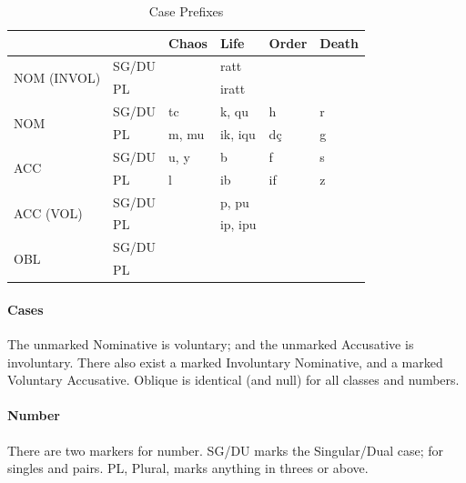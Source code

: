 \documentclass[11pt]{article}
\begin{document}
\begin{table}[H]
\begin{center}
\caption{Case Prefixes}
\label{table-cases}
\begin{tabular}{llllll}
                            &           & \textbf{Chaos} & \textbf{Life} & \textbf{Order} & \textbf{Death} \\
\hline\hline
\multirow{2}{*}{NOM (INVOL)} & SG/DU     &              & ratt         &               &               \\
                            & PL        &           & iratt       &              &               \\
\hline
\multirow{2}{*}{NOM}        & SG/DU     & tc             & k, qu         & h              & r              \\
                                                                                    & PL        & m, mu          & ik, iqu       & dç             & g              \\
\hline
\multirow{2}{*}{ACC}                 & SG/DU     & u, y           & b             & f              & s              \\
                            & PL        & l              & ib            & if             & z              \\
\hline
\multirow{2}{*}{ACC (VOL)}  & SG/DU     &                & p, pu         &                &                \\
                            & PL        &                & ip, ipu       &                &                \\
\hline
\multirow{2}{*}{OBL}        & SG/DU     &            &             &           &             \\
                            & PL        &            &             &         &           
\end{tabular}
\end{center}
\end{table}

\paragraph{Cases}
The unmarked Nominative is voluntary;
and the unmarked Accusative is involuntary.
There also exist a marked Involuntary Nominative,
and a marked Voluntary Accusative.
Oblique is identical (and null) for all classes and numbers.

\paragraph{Number}
There are two markers for number. SG/DU marks the Singular/Dual case;
for singles and pairs. PL, Plural, marks anything in threes or above.
\end{document}
